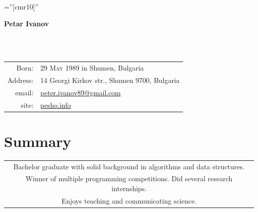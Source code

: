 \documentclass[a4paper,10pt]{article}
\def\name{Petar Ivanov}
\newcommand{\minorcolor}[1]{\textcolor{mygray}{#1}}
\begin{document}
\pagestyle{empty}				%
\font\fb=''[cmr10]''				%

\begin{figure}
	\setlength\fboxsep{0pt}
	\setlength\fboxrule{0.1pt}
        \vspace{-50pt}
\end{figure}


\par{\raggedright\Huge\textbf{\vspace{-3mm}\hspace{0mm}\name}}\\		%
\vspace{-5mm}{\color{linegray}\rule{10.5cm}{0.1mm}}\\

\hspace{4mm}\begin{tabular}{rl}
        \minorcolor{Born:} & \textsc{29 May 1989} in Shumen, Bulgaria\\
	\minorcolor{Address:} & \textsc{14} Georgi Kirkov str., Shumen \textsc{9700}, Bulgaria\\
	\minorcolor{email:} & \href{mailto:peter.ivanov89@gmail.com}{peter.ivanov89@gmail.com}\\
	\minorcolor{site:} & \href{http://pesho.info}{pesho.info}\\
\end{tabular}
\bigskip


\section{Summary}
\begin{center}
  \begin{tabular}{c}
      Bachelor graduate with solid background in algorithms and data structures.\\
      Winner of multiple programming competitions. Did several research internships.\\
      Enjoys teaching and communicating science.\\
    \end{tabular}
\end{center}
\end{document}
